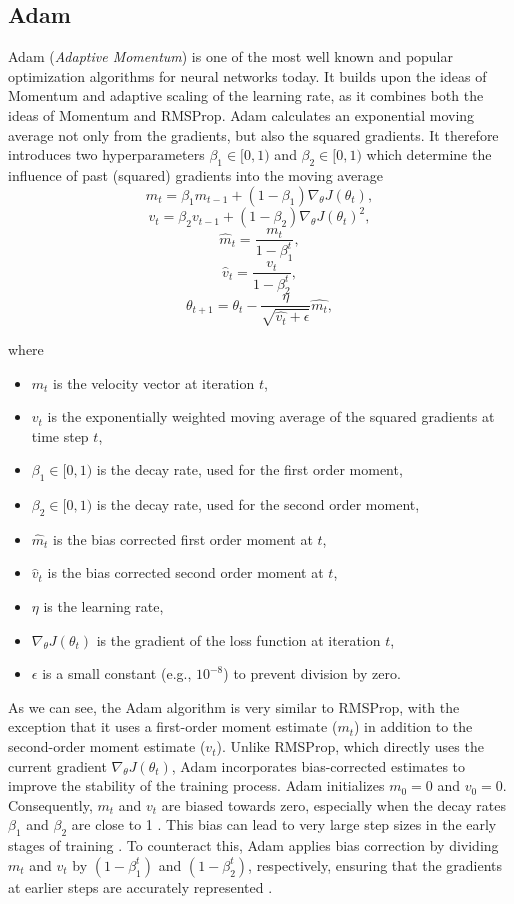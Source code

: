 \subsection{Adam \cite{kingma2017adam}}
\label{sec:adam}

Adam (\emph{Adaptive Momentum}) is one of the most well known and popular
optimization algorithms for neural networks today. It builds upon the ideas of Momentum and
adaptive scaling of the learning rate, as it combines both the ideas of Momentum and RMSProp.
Adam calculates an exponential moving average not only from the gradients, but also the squared gradients.
It therefore introduces two hyperparameters $\beta_1 \in [0,1)$ and $\beta_2 \in [0,1)$ which determine the
influence of past (squared) gradients into the moving average
\[m_t = \beta_1 m_{t-1} + (1 - \beta_1) \nabla_{\theta} J(\theta_t), \]
\[v_t = \beta_2 v_{t-1} + (1 - \beta_2) \nabla_{\theta} J(\theta_t)^2, \]
\[\hat{m}_t = \frac{m_t}{1-\beta_1^t}, \]
\[\hat{v}_t = \frac{v_t}{1-\beta_2^t}, \]
\[\theta_{t+1} = \theta_t - \frac{\eta}{\sqrt{\hat{v_t} + \epsilon}} \hat{m_t}, \]

where
\begin{itemize}
    \item $m_t$ is the velocity vector at iteration $t$,
    \item $v_t$ is the exponentially weighted moving average of the squared gradients at time step $t$,
    \item $\beta_1 \in [0, 1) $ is the decay rate, used for the first order moment,
    \item $\beta_2 \in [0, 1) $ is the decay rate,  used for the second order moment,
    \item $\hat{m}_t$ is the bias corrected first order moment at $t$,
    \item $\hat{v}_t$ is the bias corrected second order moment at $t$,
    \item $\eta$ is the learning rate,
    \item $\nabla_{\theta} J(\theta_t)$ is the gradient of the loss function at iteration $t$,
    \item $\epsilon$ is a small constant (e.g., $10^{-8}$) to prevent division by zero.
\end{itemize}
As we can see, the Adam algorithm is very similar to RMSProp, with the exception that it
uses a first-order moment estimate ($m_t$) in addition to the second-order moment estimate
($v_t$). Unlike RMSProp, which directly uses the current gradient
 $\nabla_{\theta} J(\theta_t)$, Adam incorporates bias-corrected estimates to improve the
stability of the training process.
Adam initializes $m_0 = 0$ and $v_0 = 0$. Consequently, $m_t$ and $v_t$ are biased towards
zero, especially when the decay rates $\beta_1$ and $\beta_2$ are close to 1 \cite{d2l2023adam}. This bias
can lead to very large step sizes in the early stages of training \cite{Goodfellow-et-al-2016}. To counteract this,
Adam applies bias correction by dividing $m_t$ and $v_t$ by $(1 - \beta_1^t)$ and
$(1 - \beta_2^t)$, respectively, ensuring that the gradients at earlier steps are
accurately represented \cite{d2l2023adam}.

